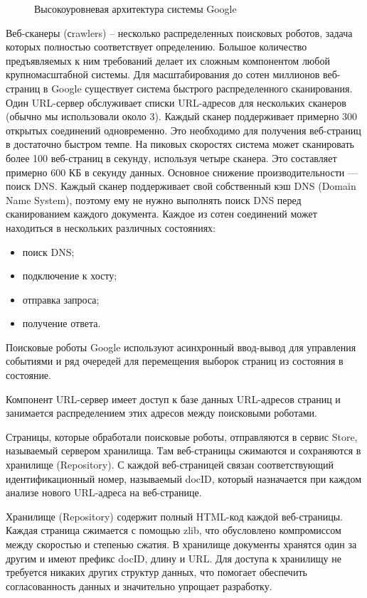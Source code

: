 \begin{figure}
\caption{Высокоуровневая архитектура системы Google}
\label{google:image}
\end{figure}

Веб-сканеры (сrawlers) -- несколько распределенных поисковых роботов, задача которых полностью соответствует определению. Большое количество предъявляемых к ним требований делает их сложным компонентом любой крупномасштабной системы. 
Для масштабирования до сотен миллионов веб-страниц в Google существует система быстрого распределенного сканирования. Один URL-сервер обслуживает списки URL-адресов для нескольких сканеров (обычно мы использовали около 3). Каждый сканер поддерживает примерно 300 открытых соединений одновременно. Это необходимо для получения веб-страниц в достаточно быстром темпе. На пиковых скоростях система может сканировать более 100 веб-страниц в секунду, используя четыре сканера. Это составляет примерно 600 КБ в секунду данных. Основное снижение производительности — поиск DNS. Каждый сканер поддерживает свой собственный кэш DNS (Domain Name System), поэтому ему не нужно выполнять поиск DNS перед сканированием каждого документа. Каждое из сотен соединений может находиться в нескольких различных состояниях:
\begin{itemize}
\item поиск DNS;
\item подключение к хосту;
\item отправка запроса;
\item получение ответа.
\end{itemize}
Поисковые роботы Google используют асинхронный ввод-вывод для управления событиями и ряд очередей для перемещения выборок страниц из состояния в состояние.

Компонент URL-сервер имеет доступ к базе данных URL-адресов страниц и занимается распределением этих адресов между поисковыми роботами.

Страницы, которые обработали поисковые роботы, отправляются в сервис Store, называемый сервером хранилища. Там веб-страницы сжимаются и сохраняются в хранилище (Repository). С каждой веб-страницей связан соответствующий идентификационный номер, называемый docID, который назначается при каждом анализе нового URL-адреса на веб-странице.

Хранилище  (Repository) содержит полный HTML-код каждой веб-страницы. Каждая страница сжимается с помощью zlib, что обусловлено компромиссом между скоростью и степенью сжатия. 
В хранилище документы хранятся один за другим и имеют префикс docID, длину и URL. Для доступа к хранилищу не требуется никаких других структур данных, что помогает обеспечить согласованность данных и значительно упрощает разработку.

